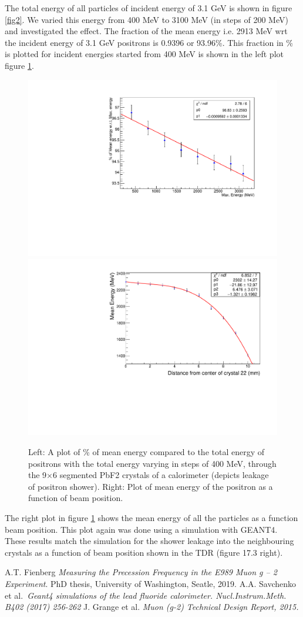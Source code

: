 \documentclass[article,accept,moreauthors,pdftex,10pt,a4paper]{../MDPI_template/Definitions/mdpi}
\begin{document}
The total energy of all particles of incident energy of 3.1 GeV is shown in figure \ref{fig2}. 
We varied this energy from 400 MeV to 3100 MeV (in steps of 200 MeV) and investigated the effect. 
The fraction of the mean energy i.e. 2913 MeV wrt the incident energy of 3.1 GeV positrons is 0.9396 
or 93.96\%. This fraction in \% is plotted for incident energies started from 400 MeV 
is shown in the left plot figure \ref{fig6}. 
\begin{figure}[H]
\centering
\includegraphics[width=7.5 cm]{mean_fraction.pdf}
\includegraphics[width=7.5 cm]{mean_tot_energy.pdf}
\caption{\label{fig6}Left: A plot of \% of mean energy compared to the total energy of positrons 
with the total energy varying in steps of 400 MeV, through the 9$\times$6 segmented PbF2 crystals of 
a calorimeter (depicts leakage of positron shower). Right: Plot of mean energy of the positron as a function of beam position.}
\end{figure}
The right plot in figure \ref{fig6} shows the mean energy of all the particles as a function beam position. This plot again was 
done using a simulation with GEANT4. These results match the simulation for the shower leakage into the neighbouring crystals 
as a function of beam position shown in the TDR (figure 17.3 right)\cite{c3}. 
\begin{thebibliography}{999}
A.T. Fienberg {\em Measuring the Precession Frequency in the E989 Muon g -- 2 Experiment}. 
PhD thesis, University of Washington, Seatle, 2019.
A.A. Savchenko et al.{\em ~Geant4 simulations of the lead fluoride calorimeter. Nucl.Instrum.Meth. B402 (2017) 256-262}
J. Grange et al. {\em Muon (g-2) Technical Design Report, 2015.}
\end{thebibliography}
\end{document}
